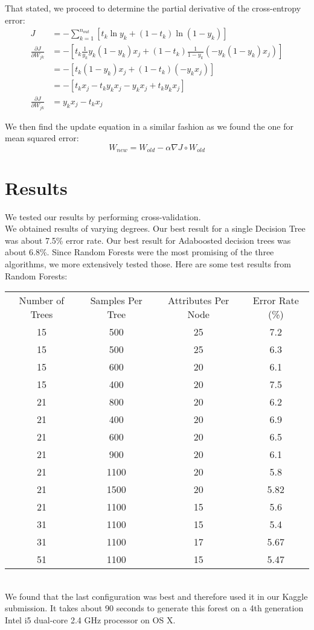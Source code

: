 \documentclass[11pt]{article}
\begin{document}
That stated, we proceed to determine the partial derivative of the cross-entropy error:
\begin{align}
J &= - \sum_{k=1}^{n_{out}}\left[t_k \ln y_k + \left(1- t_k \right)\ln \left( 1- y_k \right) \right] \\
\frac{\partial J}{\partial W_{jk}} &= 
- \left[ t_k \frac{1}{y_k} y_k \left( 1 - y_k \right) x_j + \left( 1 - t_k \right) \frac{1}{1 - y_k} \left( - y_k \left( 1 - y_k \right) x_j \right) \right] \\
&= - \left[ t_k \left( 1 - y_k \right) x_j + \left( 1 - t_k \right) \left( -y_k x_j \right) \right] \\
&= - \left[ t_k x_j - t_k y_k x_j - y_k x _j + t_k y_k x_j \right] \\
\frac{\partial J}{\partial W_{jk}} &= y_k x_j - t_k x_j
\end{align}

We then find the update equation in a similar fashion as we found the one for mean squared error:
\[
	W_{new} = W_{old} - \alpha \nabla J \circ W_{old}
\]  
\section{Results}

We tested our results by performing cross-validation. \\

We obtained results of varying degrees. Our best result for a single Decision Tree was about 7.5\% error rate. Our best result for Adaboosted decision trees was about 6.8\%. Since Random Forests were the most promising of the three algorithms, we more extensively tested those. Here are some test results from Random Forests: \\

\begin{tabular}{|c|c|c||c|}
\hline
Number of Trees & Samples Per Tree & Attributes Per Node & Error Rate (\%)\\
15 & 500 & 25 & 7.2 \\
15 & 500 & 25 & 6.3 \\
15 & 600 & 20 & 6.1 \\
15 & 400 & 20 & 7.5 \\
21 & 800 & 20 & 6.2 \\
21 & 400 & 20 & 6.9 \\
21 & 600 & 20 & 6.5 \\
21 & 900 & 20 & 6.1 \\
21 & 1100 & 20 & 5.8 \\
21 & 1500 & 20 & 5.82 \\
21 & 1100 & 15 & 5.6 \\
31 & 1100 & 15 & 5.4 \\
31 & 1100 & 17 & 5.67 \\
51 & 1100 & 15 & 5.47 \\
\hline
\end{tabular}
\vspace{11pt}
\\
We found that the last configuration was best and therefore used it in our Kaggle submission. It takes about 90 seconds to generate this forest on a 4th generation Intel i5 dual-core 2.4 GHz processor on OS X. 
\end{document}
